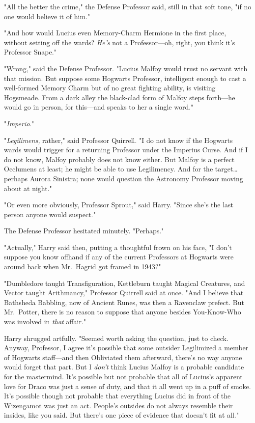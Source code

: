 "All the better the crime," the Defense Professor said, still in that soft 
tone, "if no one would believe it of him."

"And how would Lucius even Memory-Charm Hermione in the first place, without 
setting off the wards? \emph{He's} not a Professor---oh, right, you think it's 
Professor Snape."

"Wrong," said the Defense Professor. "Lucius Malfoy would trust no servant with 
that mission. But suppose some Hogwarts Professor, intelligent enough to cast a 
well-formed Memory Charm but of no great fighting ability, is visiting 
Hogsmeade. From a dark alley the black-clad form of Malfoy steps forth---he 
would go in person, for this---and speaks to her a single word."

"\emph{Imperio}."

"\emph{Legilimens,} rather," said Professor Quirrell. "I do not know if the 
Hogwarts wards would trigger for a returning Professor under the Imperius 
Curse. And if I do not know, Malfoy probably does not know either. But Malfoy 
is a perfect Occlumens at least; he might be able to use Legilimency. And for 
the target{\ldots}perhaps Aurora Sinistra; none would question the Astronomy 
Professor moving about at night."

"Or even more obviously, Professor Sprout," said Harry. "Since she's the last 
person anyone would suspect."

The Defense Professor hesitated minutely. "Perhaps."

"Actually," Harry said then, putting a thoughtful frown on his face, "I don't 
suppose you know offhand if any of the current Professors at Hogwarts were 
around back when Mr.~Hagrid got framed in 1943?"

"Dumbledore taught Transfiguration, Kettleburn taught Magical Creatures, and 
Vector taught Arithmancy," Professor Quirrell said at once. "And I believe that 
Bathsheda Babbling, now of Ancient Runes, was then a Ravenclaw prefect. But 
Mr.~Potter, there is no reason to suppose that anyone besides You-Know-Who was 
involved in \emph{that} affair."

Harry shrugged artfully. "Seemed worth asking the question, just to check. 
Anyway, Professor, I agree it's possible that some outsider Legilimized a 
member of Hogwarts staff---and then Obliviated them afterward, there's no way 
anyone would forget that part. But I \emph{don't} think Lucius Malfoy is a 
probable candidate for the mastermind. It's possible but not probable that all 
of Lucius's apparent love for Draco was just a sense of duty, and that it all 
went up in a puff of smoke. It's possible though not probable that everything 
Lucius did in front of the Wizengamot was just an act. People's outsides do not 
always resemble their insides, like you said. But there's one piece of evidence 
that doesn't fit at all."

